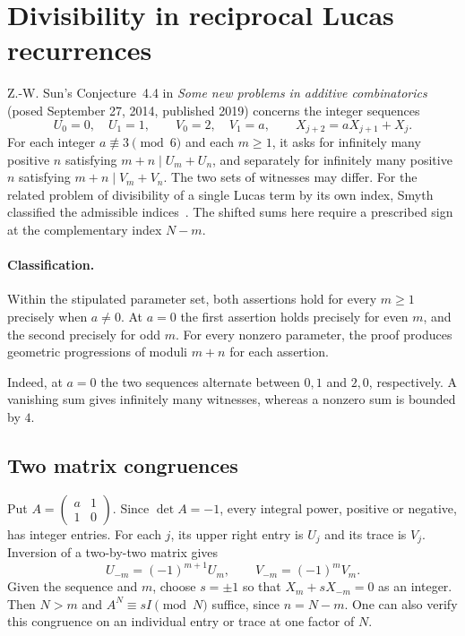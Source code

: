 \documentclass[11pt,a4paper]{article}
\theoremstyle{remark}\newtheorem{remark}[theorem]{Remark}
\numberwithin{equation}{section}
\begin{document}
\section{Divisibility in reciprocal Lucas recurrences}

Z.-W. Sun's Conjecture~4.4 in \emph{Some new problems in additive
combinatorics}~\cite{Sun2019} (posed September 27, 2014, published 2019) concerns
the integer sequences
\[
 U_0=0,\quad U_1=1,\qquad V_0=2,\quad V_1=a,\qquad
 X_{j+2}=aX_{j+1}+X_j.
\]
For each integer $a\not\equiv3\pmod6$ and each $m\ge1$, it asks
for infinitely many positive $n$ satisfying $m+n\mid U_m+U_n$,
and separately for infinitely many positive $n$ satisfying
$m+n\mid V_m+V_n$. The two sets of witnesses may differ. For the related problem of divisibility of a single Lucas term by its own index, Smyth classified the admissible indices~\cite{Smyth}. The shifted sums here require a prescribed sign at the complementary index $N-m$.

\paragraph{Classification.}
Within the stipulated parameter set, both assertions hold for every
$m\ge1$ precisely when $a\ne0$. At $a=0$ the first assertion holds
precisely for even $m$, and the second precisely for odd $m$.
For every nonzero parameter, the proof produces geometric progressions
of moduli $m+n$ for each assertion.

Indeed, at $a=0$ the two sequences alternate between $0,1$ and $2,0$,
respectively. A vanishing sum gives infinitely many witnesses, whereas
a nonzero sum is bounded by $4$.

\subsection{Two matrix congruences}

Put $A=\left(\begin{smallmatrix}a&1\\1&0\end{smallmatrix}\right)$.
Since $\det A=-1$, every integral power, positive or negative, has
integer entries. For each $j$, its upper right entry is $U_j$ and its
trace is $V_j$. Inversion of a two-by-two matrix gives
\[
 U_{-m}=(-1)^{m+1}U_m,\qquad V_{-m}=(-1)^m V_m .
\]
Given the sequence and $m$, choose $s=\pm1$ so that
$X_m+sX_{-m}=0$ as an integer. Then $N>m$ and
$A^N\equiv sI\pmod N$ suffice, since $n=N-m$.
One can also verify this congruence on an individual entry or trace
at one factor of $N$.
\end{document}
